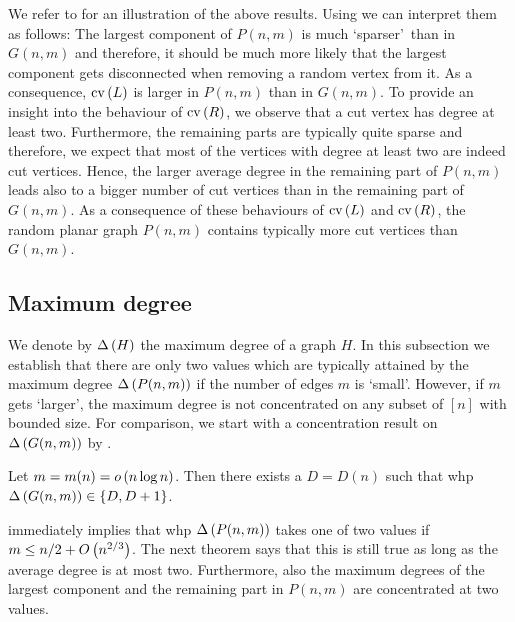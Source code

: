 We refer to  for an illustration of the above results. Using  we can interpret them as follows: The largest component of $P(n,m)$ is much \lq sparser\rq\ than in $G(n,m)$ and therefore, it should be much more likely that the largest component gets disconnected when removing a random vertex from it. As a consequence, $\operatorname{cv}\left(L\right)$ is larger in $P(n,m)$ than in $G(n,m)$. To provide an insight into the behaviour of $\operatorname{cv}\left(R\right)$, we observe that a cut vertex has degree at least two. Furthermore, the remaining parts are typically quite sparse and therefore, we expect that most of the vertices with degree at least two are indeed cut vertices. Hence, the larger average degree in the remaining part of $P(n,m)$ leads also to a bigger number of cut vertices than in the remaining part of $G(n,m)$. As a consequence of these behaviours of $\operatorname{cv}\left(L\right)$ and $\operatorname{cv}\left(R\right)$, the random planar graph $P(n,m)$ contains typically more cut vertices than $G(n,m)$.

\subsection{Maximum degree}\label{subsec:results_maxdegree}

We denote by $\Delta\left(H\right)$ the maximum degree of a graph $H$. In this subsection we establish that there are only two values which are typically attained by the maximum degree $\Delta\left(P(n,m)\right)$ if the number of edges $m$ is \lq small\rq. However, if $m$ gets \lq larger\rq, the maximum degree is not concentrated on any subset of $[n]$ with bounded size. For comparison, we start with a concentration result on $\Delta\left(G(n,m)\right)$ by \Bollobas \cite{Bollobas1982}.

\begin{thm}\label{thm:main_max_degree_gnm}
Let $m=m(n)=o\left(n\log n\right)$. Then there exists a $D=D(n)$ such that whp $\Delta\left(G(n,m)\right)\in\left\{D,D+1\right\}$.
\end{thm}

 immediately implies that whp $\Delta\left(P(n,m)\right)$ takes one of two values if $m\leq n/2+O\left(n^{2/3}\right)$. The next theorem says that this is still true as long as the average degree is at most two. Furthermore, also the maximum degrees of the largest component and the remaining part in $P(n,m)$ are concentrated at two values.

